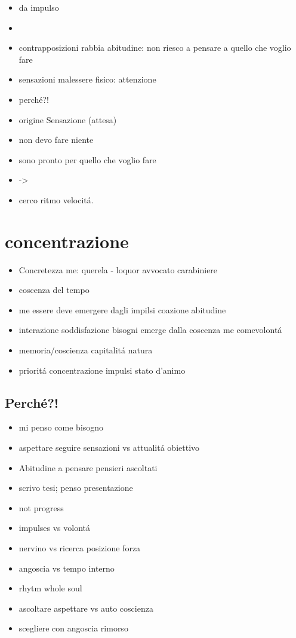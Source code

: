 \begin{itemize}
\item {} da impulso
\item {}
\item contrapposizioni rabbia abitudine: non riesco a pensare a quello che voglio fare
\item sensazioni malessere fisico: attenzione
\item perch\'e?!
\item origine Sensazione (attesa)
\item non devo fare niente
\item sono pronto per quello che voglio fare
\item {} -> 
\item cerco ritmo velocit\'a. 
\end{itemize}

\section{concentrazione}

\begin{itemize}
\item Concretezza me: querela - loquor avvocato carabiniere
\item coscenza del tempo
\item me essere deve emergere dagli impilsi coazione abitudine
\item interazione soddisfazione bisogni emerge dalla coscenza me comevolont\'a
\item memoria/coscienza capitalit\'a natura
\item priorit\'a concentrazione impulsi stato d'animo
\end{itemize}

\subsection{Perch\'e?!}

\begin{itemize}
\item mi penso come bisogno
\item aspettare seguire sensazioni vs attualit\'a obiettivo
\item Abitudine a pensare pensieri ascoltati
\item scrivo tesi; penso presentazione
\item not progress
\item impulses vs volont\'a
\item nervino vs ricerca posizione forza
\item angoscia vs tempo interno
\item rhytm whole soul
\item ascoltare aspettare vs auto coscienza
\item scegliere con angoscia rimorso
\end{itemize}

